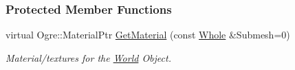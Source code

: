 \subsubsection*{Protected Member Functions}
\begin{DoxyCompactItemize}
\item 
\hypertarget{classMezzanine_1_1WorldObjectGraphicsSettings_a0580ad16e378357dfa47944097db9f80}{
virtual Ogre::MaterialPtr \hyperlink{classMezzanine_1_1WorldObjectGraphicsSettings_a0580ad16e378357dfa47944097db9f80}{GetMaterial} (const \hyperlink{namespaceMezzanine_adcbb6ce6d1eb4379d109e51171e2e493}{Whole} \&Submesh=0)}
\label{classMezzanine_1_1WorldObjectGraphicsSettings_a0580ad16e378357dfa47944097db9f80}

\begin{DoxyCompactList}\small\item\em Material/textures for the \hyperlink{classMezzanine_1_1World}{World} Object. \item\end{DoxyCompactList}\end{DoxyCompactItemize}
